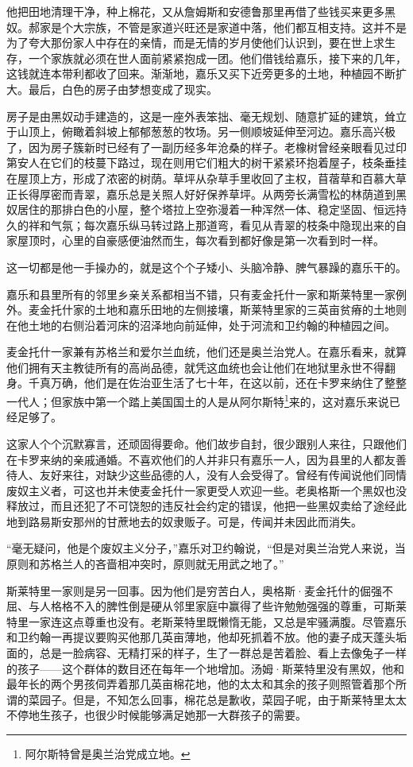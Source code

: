 \par 他把田地清理干净，种上棉花，又从詹姆斯和安德鲁那里再借了些钱买来更多黑奴。郝家是个大宗族，不管是家道兴旺还是家道中落，他们都互相支持。这并不是为了夸大那份家人中存在的亲情，而是无情的岁月使他们认识到，要在世上求生存，一个家族就必须在世人面前紧紧抱成一团。他们借钱给嘉乐，接下来的几年，这钱就连本带利都收了回来。渐渐地，嘉乐又买下近旁更多的土地，种植园不断扩大。最后，白色的房子由梦想变成了现实。
\par 房子是由黑奴动手建造的，这是一座外表笨拙、毫无规划、随意扩延的建筑，耸立于山顶上，俯瞰着斜坡上郁郁葱葱的牧场。另一侧顺坡延伸至河边。嘉乐高兴极了，因为房子簇新时已经有了一副历经多年沧桑的样子。老橡树曾经亲眼看见过印第安人在它们的枝蔓下路过，现在则用它们粗大的树干紧紧环抱着屋子，枝条垂挂在屋顶上方，形成了浓密的树荫。草坪从杂草手里收回了主权，苜蓿草和百慕大草正长得厚密而青翠，嘉乐总是关照人好好保养草坪。从两旁长满雪松的林荫道到黑奴居住的那排白色的小屋，整个塔拉上空弥漫着一种浑然一体、稳定坚固、恒远持久的祥和气氛；每次嘉乐纵马转过路上那道弯，看见从青翠的枝条中隐现出来的自家屋顶时，心里的自豪感便油然而生，每次看到都好像是第一次看到时一样。
\par 这一切都是他一手操办的，就是这个个子矮小、头脑冷静、脾气暴躁的嘉乐干的。
\par 嘉乐和县里所有的邻里乡亲关系都相当不错，只有麦金托什一家和斯莱特里一家例外。麦金托什家的土地和嘉乐田地的左侧接壤，斯莱特里家的三英亩贫瘠的土地则在他土地的右侧沿着河床的沼泽地向前延伸，处于河流和卫约翰的种植园之间。
\par 麦金托什一家兼有苏格兰和爱尔兰血统，他们还是奥兰治党人。在嘉乐看来，就算他们拥有天主教徒所有的高尚品德，就凭这血统也会让他们在地狱里永世不得翻身。千真万确，他们是在佐治亚生活了七十年，在这以前，还在卡罗来纳住了整整一代人；但家族中第一个踏上美国国土的人是从阿尔斯特\footnote{阿尔斯特曾是奥兰治党成立地。}来的，这对嘉乐来说已经足够了。
\par 这家人个个沉默寡言，还顽固得要命。他们故步自封，很少跟别人来往，只跟他们在卡罗来纳的亲戚通婚。不喜欢他们的人并非只有嘉乐一人，因为县里的人都友善待人、友好来往，对缺少这些品德的人，没有人会受得了。曾经有传闻说他们同情废奴主义者，可这也并未使麦金托什一家更受人欢迎一些。老奥格斯一个黑奴也没释放过，而且还犯了不可饶恕的违反社会约定的错误，他把一些黑奴卖给了途经此地到路易斯安那州的甘蔗地去的奴隶贩子。可是，传闻并未因此而消失。
\par “毫无疑问，他是个废奴主义分子，”嘉乐对卫约翰说，“但是对奥兰治党人来说，当原则和苏格兰人的吝啬相冲突时，原则就无用武之地了。”
\par 斯莱特里一家则是另一回事。因为他们是穷苦白人，奥格斯·麦金托什的倔强不屈、与人格格不入的脾性倒是硬从邻里家庭中赢得了些许勉勉强强的尊重，可斯莱特里一家连这点尊重也没有。老斯莱特里既懒惰无能，又总是牢骚满腹。尽管嘉乐和卫约翰一再提议要购买他那几英亩薄地，他却死抓着不放。他的妻子成天蓬头垢面的，总是一脸病容、无精打采的样子，生了一群总是苦着脸、看上去像兔子一样的孩子——这个群体的数目还在每年一个地增加。汤姆·斯莱特里没有黑奴，他和最年长的两个男孩伺弄着那几英亩棉花地，他的太太和其余的孩子则照管着那个所谓的菜园子。但是，不知怎么回事，棉花总是歉收，菜园子呢，由于斯莱特里太太不停地生孩子，也很少时候能够满足她那一大群孩子的需要。
